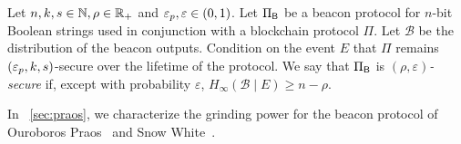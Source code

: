 \begin{definition}\label{def:grinding-insecurity}
    Let $n, k, s \in \mathbb{N}, \rho \in \mathbb{R}_+$ and $\mathsf{\varepsilon}_p, \varepsilon \in (0,1)$.
    Let $\Pi_{\mathsf{B}}$ be a beacon protocol for $n$-bit Boolean strings 
    used in conjunction with a blockchain protocol $\Pi$. 
    Let $\mathcal{B}$ be the distribution of the beacon outputs.
    Condition on the event $E$ that $\Pi$ remains $(\mathsf{\varepsilon}_p, k, s)$-secure over the lifetime of the protocol. 
    We say that $\Pi_{\mathsf{B}}$ is \emph{$(\rho, \varepsilon)$-secure} 
    if, except with probability $\varepsilon$, 
    $H_\infty(\mathcal{B} \mid E) \geq n - \rho$.    
\end{definition}


In \Section~\ref{sec:praos}, we characterize the grinding power 
for the beacon protocol of Ouroboros Praos~\cite{Praos} and Snow White~\cite{SnowWhite}.





